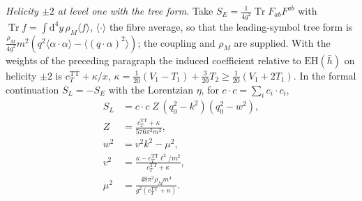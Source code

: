 \emph{Helicity \(\pm2\) at level one with the tree form.} Take \(S_E=\tfrac1{4g^2}\operatorname{Tr}F_{ab}F^{ab}\) with \(\operatorname{Tr}f=\int\mathrm d^4y\,\rho_M\langle f\rangle\), \(\langle\cdot\rangle\) the fibre average, so that the leading-symbol tree form is \(\tfrac{\rho_M}{4g^2}m^2(q^2\langle\alpha\cdot\alpha\rangle-\langle(q\cdot\alpha)^2\rangle)\); the coupling and \(\rho_M\) are supplied. With the weights of the preceding paragraph the induced coefficient relative to \(\mathrm{EH}(\bar h)\) on helicity \(\pm2\) is \(c_T^{\mathrm{TT}}+\kappa/x\), \(\kappa=\tfrac1{20}(V_1-T_1)+\tfrac3{20}T_2\ge\tfrac1{20}(V_1+2T_1)\). In the formal continuation \(S_L=-S_E\) with the Lorentzian \(\eta\), for \(c\cdot c=\sum_ic_i\cdot c_i\),
\[
\begin{aligned}
  S_L
  &= c\cdot c\;Z\,(q_0^2-k^2)(q_0^2-w^2),\\
  Z
  &= \frac{c_T^{\mathrm{TT}}+\kappa}{576\pi^2 m^2},\\
  w^2
  &= v^2 k^2 - \mu^2,\\
  v^2
  &= \frac{\kappa - c_T^{\mathrm{TT}}\ell^2/m^2}{c_T^{\mathrm{TT}}+\kappa},\\
  \mu^2
  &= \frac{48\pi^2\rho_M m^4}{g^2(c_T^{\mathrm{TT}}+\kappa)}.
\end{aligned}
\]
